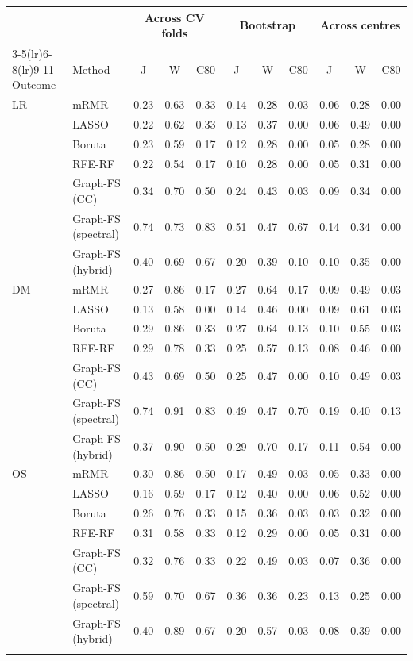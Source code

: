 \begin{tabular}{@{}llccccccccc@{}}
\toprule
 & & \multicolumn{3}{c}{Across CV folds} & \multicolumn{3}{c}{Bootstrap} & \multicolumn{3}{c}{Across centres} \\
\cmidrule(lr){3-5}\cmidrule(lr){6-8}\cmidrule(lr){9-11}
Outcome & Method & J & W & C80 & J & W & C80 & J & W & C80 \\
\midrule
LR & mRMR & 0.23 & 0.63 & 0.33 & 0.14 & 0.28 & 0.03 & 0.06 & 0.28 & 0.00 \\
 & LASSO & 0.22 & 0.62 & 0.33 & 0.13 & 0.37 & 0.00 & 0.06 & 0.49 & 0.00 \\
 & Boruta & 0.23 & 0.59 & 0.17 & 0.12 & 0.28 & 0.00 & 0.05 & 0.28 & 0.00 \\
 & RFE-RF & 0.22 & 0.54 & 0.17 & 0.10 & 0.28 & 0.00 & 0.05 & 0.31 & 0.00 \\
 & Graph-FS (CC) & 0.34 & 0.70 & 0.50 & 0.24 & 0.43 & 0.03 & 0.09 & 0.34 & 0.00 \\
 & Graph-FS (spectral) & 0.74 & 0.73 & 0.83 & 0.51 & 0.47 & 0.67 & 0.14 & 0.34 & 0.00 \\
 & Graph-FS (hybrid) & 0.40 & 0.69 & 0.67 & 0.20 & 0.39 & 0.10 & 0.10 & 0.35 & 0.00 \\
\midrule
DM & mRMR & 0.27 & 0.86 & 0.17 & 0.27 & 0.64 & 0.17 & 0.09 & 0.49 & 0.03 \\
 & LASSO & 0.13 & 0.58 & 0.00 & 0.14 & 0.46 & 0.00 & 0.09 & 0.61 & 0.03 \\
 & Boruta & 0.29 & 0.86 & 0.33 & 0.27 & 0.64 & 0.13 & 0.10 & 0.55 & 0.03 \\
 & RFE-RF & 0.29 & 0.78 & 0.33 & 0.25 & 0.57 & 0.13 & 0.08 & 0.46 & 0.00 \\
 & Graph-FS (CC) & 0.43 & 0.69 & 0.50 & 0.25 & 0.47 & 0.00 & 0.10 & 0.49 & 0.03 \\
 & Graph-FS (spectral) & 0.74 & 0.91 & 0.83 & 0.49 & 0.47 & 0.70 & 0.19 & 0.40 & 0.13 \\
 & Graph-FS (hybrid) & 0.37 & 0.90 & 0.50 & 0.29 & 0.70 & 0.17 & 0.11 & 0.54 & 0.00 \\
\midrule
OS & mRMR & 0.30 & 0.86 & 0.50 & 0.17 & 0.49 & 0.03 & 0.05 & 0.33 & 0.00 \\
 & LASSO & 0.16 & 0.59 & 0.17 & 0.12 & 0.40 & 0.00 & 0.06 & 0.52 & 0.00 \\
 & Boruta & 0.26 & 0.76 & 0.33 & 0.15 & 0.36 & 0.03 & 0.03 & 0.32 & 0.00 \\
 & RFE-RF & 0.31 & 0.58 & 0.33 & 0.12 & 0.29 & 0.00 & 0.05 & 0.31 & 0.00 \\
 & Graph-FS (CC) & 0.32 & 0.76 & 0.33 & 0.22 & 0.49 & 0.03 & 0.07 & 0.36 & 0.00 \\
 & Graph-FS (spectral) & 0.59 & 0.70 & 0.67 & 0.36 & 0.36 & 0.23 & 0.13 & 0.25 & 0.00 \\
 & Graph-FS (hybrid) & 0.40 & 0.89 & 0.67 & 0.20 & 0.57 & 0.03 & 0.08 & 0.39 & 0.00 \\
\botrule
\end{tabular}
